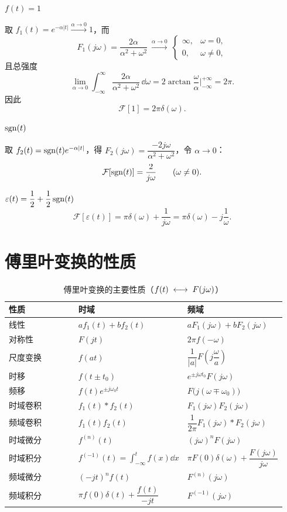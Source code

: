  $f(t)=1$

取 $f_1(t)=e^{-\alpha|t|}\xrightarrow{\alpha\to0}1$，而
\[
    F_1(j\omega)=\frac{2\alpha}{\alpha^{2}+\omega^{2}}
    \ \xrightarrow{\alpha\to0}\
    \begin{cases}
        \infty, & \omega=0,\\
        0, & \omega\neq 0,
    \end{cases}
\]
且总强度
\[
    \lim_{\alpha\to0}\int_{-\infty}^{\infty}\frac{2\alpha}{\alpha^{2}+\omega^{2}}\,\dd\omega
    =2\arctan\frac{\omega}{\alpha}\Big|_{-\infty}^{+\infty}=2\pi .
\]
因此
\[
    \mathcal{F}[1]=2\pi\delta(\omega).
\]

 $\operatorname{sgn}(t)$

取 $f_2(t)=\operatorname{sgn}(t)e^{-\alpha|t|}$，得
$F_2(j\omega)=\dfrac{-2j\omega}{\alpha^{2}+\omega^{2}}$，令 $\alpha\to0$：
\[
    \mathcal{F}[\operatorname{sgn}(t)]=\frac{2}{j\omega}\qquad(\omega\neq 0).
\]

\quad
$\varepsilon(t)=\dfrac{1}{2}+\dfrac{1}{2}\operatorname{sgn}(t)$
\[
    \mathcal{F}[\varepsilon(t)]=\pi\delta(\omega)+\frac{1}{j\omega}
    =\pi\delta(\omega)-j\frac{1}{\omega}.
\]

\section{傅里叶变换的性质}

\begin{table}[htbp]
\centering
\caption{傅里叶变换的主要性质（$f(t)\;\longleftrightarrow\; F(j\omega)$）}
\small
\begin{tabular}{@{}p{0.26\linewidth}p{0.34\linewidth}p{0.34\linewidth}@{}}
\toprule
性质 & 时域 & 频域 \\
\midrule
线性 & $af_1(t)+bf_2(t)$ & $aF_1(j\omega)+bF_2(j\omega)$ \\
对称性 & $F(jt)$ & $2\pi f(-\omega)$ \\
尺度变换 & $f(at)$ & $\dfrac{1}{|a|}F\!\left(j\dfrac{\omega}{a}\right)$ \\
时移 & $f(t\pm t_0)$ & $e^{\pm j\omega t_0}F(j\omega)$ \\
频移 & $f(t)e^{\pm j\omega_0 t}$ & $F\bigl(j(\omega\mp\omega_0)\bigr)$ \\
时域卷积 & $f_1(t)*f_2(t)$ & $F_1(j\omega)F_2(j\omega)$ \\
频域卷积 & $f_1(t)f_2(t)$ & $\dfrac{1}{2\pi}F_1(j\omega)*F_2(j\omega)$ \\
时域微分 & $f^{(n)}(t)$ & $(j\omega)^{n}F(j\omega)$ \\
时域积分 & $f^{(-1)}(t)=\displaystyle\int_{-\infty}^{t}f(x)\dd x$
         & $\pi F(0)\delta(\omega)+\dfrac{F(j\omega)}{j\omega}$ \\
频域微分 & $(-jt)^{n}f(t)$ & $F^{(n)}(j\omega)$ \\
频域积分 & $\pi f(0)\delta(t)+\dfrac{f(t)}{-jt}$ & $F^{(-1)}(j\omega)$ \\
\bottomrule
\end{tabular}
\end{table}

